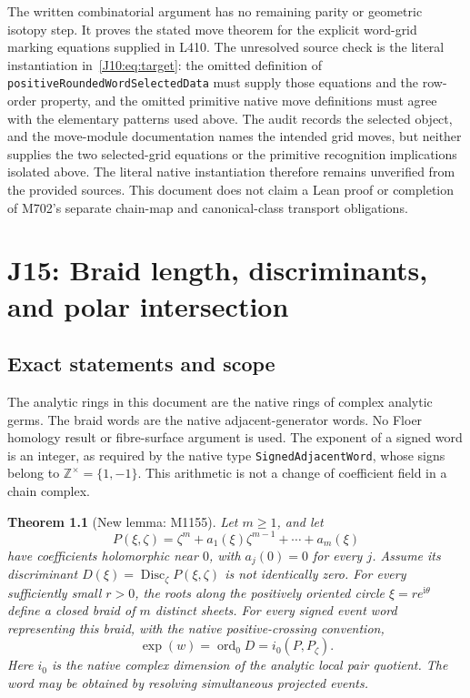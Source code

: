 \documentclass[11pt,oneside]{report}
\newtheorem{theorem}{Theorem}[section]
\theoremstyle{definition}
\numberwithin{equation}{section}
\newcommand{\Z}{\mathbb Z}
\newcommand{\decl}[1]{\textnormal{\nolinkurl{#1}}}
\newcommand{\ord}{\operatorname{ord}}
\newcommand{\Disc}{\operatorname{Disc}}
\newcommand{\Exp}{\operatorname{exp}}
\newcommand{\ii}{\mathrm i}
\begin{document}
The written combinatorial argument has no remaining parity or geometric
isotopy step. It proves the stated move theorem for the explicit word-grid
marking equations supplied in L410. The unresolved source check is the
literal instantiation in~\eqref{J10:eq:target}: the omitted definition of
\decl{positiveRoundedWordSelectedData} must supply those equations and
the row-order property, and the omitted primitive native move definitions
must agree with the elementary patterns used above. The audit records the selected object, and the move-module documentation
names the intended grid moves, but neither supplies the two selected-grid
equations or the primitive recognition implications isolated above.
The literal native instantiation therefore remains unverified from the
provided sources.
This document does not claim a Lean proof or completion of M702's
separate chain-map and canonical-class transport obligations.





\chapter{J15: Braid length, discriminants, and polar intersection}
\label{chapter:J15}



\section{Exact statements and scope}

The analytic rings in this document are the native rings of complex analytic
germs. The braid words are the native adjacent-generator words. No Floer
homology result or fibre-surface argument is used. The exponent of a signed
word is an integer, as required by the native type
\decl{SignedAdjacentWord}, whose signs belong to $\Z^\times=\{1,-1\}$.
This arithmetic is not a change of coefficient field in a chain complex.

\begin{theorem}[New lemma: M1155]
\label{J15:thm:discriminant}
Let $m\ge1$, and let
\[
 P(\xi,\zeta)=\zeta^m+a_1(\xi)\zeta^{m-1}+\cdots+a_m(\xi)
\]
have coefficients holomorphic near $0$, with $a_j(0)=0$ for every $j$.
Assume its discriminant $D(\xi)=\Disc_\zeta P(\xi,\zeta)$ is not
identically zero. For every sufficiently small $r>0$, the roots along the
positively oriented circle $\xi=r e^{\ii\theta}$ define a closed braid
of $m$ distinct sheets. For every signed event word representing this braid,
with the native positive-crossing convention,
\begin{equation}\label{J15:eq:main-discriminant}
 \Exp(w)=\ord_0 D=i_0(P,P_\zeta).
\end{equation}
Here $i_0$ is the native complex dimension of the analytic local pair quotient.
The word may be obtained by resolving simultaneous projected events.
\end{theorem}
\end{document}

